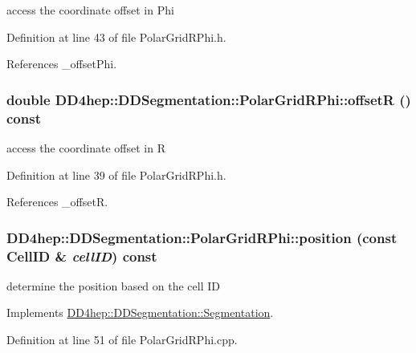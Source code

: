 access the coordinate offset in Phi 

Definition at line 43 of file PolarGridRPhi.h.

References \_\-offsetPhi.\hypertarget{class_d_d4hep_1_1_d_d_segmentation_1_1_polar_grid_r_phi_a449dc2e72e97117976fd9eae50c1e7c3}{
\subsubsection[{offsetR}]{\setlength{\rightskip}{0pt plus 5cm}double DD4hep::DDSegmentation::PolarGridRPhi::offsetR () const}}
\label{class_d_d4hep_1_1_d_d_segmentation_1_1_polar_grid_r_phi_a449dc2e72e97117976fd9eae50c1e7c3}


access the coordinate offset in R 

Definition at line 39 of file PolarGridRPhi.h.

References \_\-offsetR.\hypertarget{class_d_d4hep_1_1_d_d_segmentation_1_1_polar_grid_r_phi_a91f53cd5367a3b7472713e2bd214bf57}{
\subsubsection[{position}]{ DD4hep::DDSegmentation::PolarGridRPhi::position (const {\bf CellID} \& {\em cellID}) const}}
\label{class_d_d4hep_1_1_d_d_segmentation_1_1_polar_grid_r_phi_a91f53cd5367a3b7472713e2bd214bf57}


determine the position based on the cell ID 

Implements \hyperlink{class_d_d4hep_1_1_d_d_segmentation_1_1_segmentation_a594fe6d78667415855858d083b64acad}{DD4hep::DDSegmentation::Segmentation}.

Definition at line 51 of file PolarGridRPhi.cpp.


